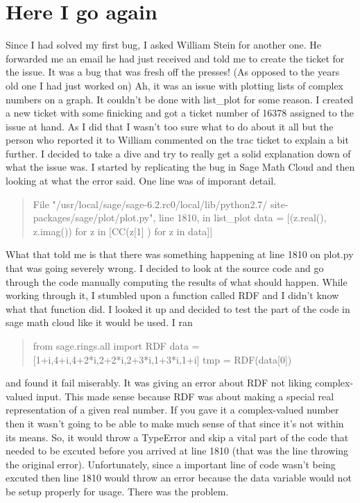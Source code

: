 \documentclass{article}
\begin{document}
\section{Here I go again}
Since I had solved my first bug, I asked William Stein for another one. He forwarded me an email he had just received and told me to create the ticket for the issue. It was a bug that was fresh off the presses! (As opposed to the years old one I had just worked on) Ah, it was an issue with plotting lists of complex numbers on a graph. It couldn't be done with list\_plot for some reason.\newline
I created a new ticket with some finicking and got a ticket number of 16378 assigned to the issue at hand. As I did that I wasn't too sure what to do about it all but the person who reported it to William commented on the trac ticket to explain a bit further. I decided to take a dive and try to really get a solid explanation down of what the issue was. I started by replicating the bug in Sage Math Cloud and then looking at what the error said. One line was of imporant detail.
\begin{quote}
File "/usr/local/sage/sage-6.2.rc0/local/lib/python2.7/ \newline
site-packages/sage/plot/plot.py", line 1810, in list\_plot \newline data = [(z.real(), z.imag()) for z in [CC(z[1] ) for z in data]]
\end{quote}
What that told me is that there was something happening at line 1810 on plot.py that was going severely wrong. I decided to look at the source code and go through the code manually computing the results of what should happen. While working through it, I stumbled upon a function called RDF and I didn't know what that function did. I looked it up and decided to test the part of the code in sage math cloud like it would be used. I ran
\begin{quote}
from sage.rings.all import RDF \newline
data = [1+i,4+i,4+2*i,2+2*i,2+3*i,1+3*i,1+i] \newline
tmp = RDF(data[0])
\end{quote}
and found it fail miserably. It was giving an error about RDF not liking complex-valued input. This made sense because RDF was about making a special real representation of a given real number. If you gave it a complex-valued number then it wasn't going to be able to make much sense of that since it's not within its means. So, it would throw a TypeError and skip a vital part of the code that needed to be excuted before you arrived at line 1810 (that was the line throwing the original error). Unfortunately, since a important line of code wasn't being excuted then line 1810 would throw an error because the data variable would not be setup properly for usage. There was the problem.\newline
\end{document}
